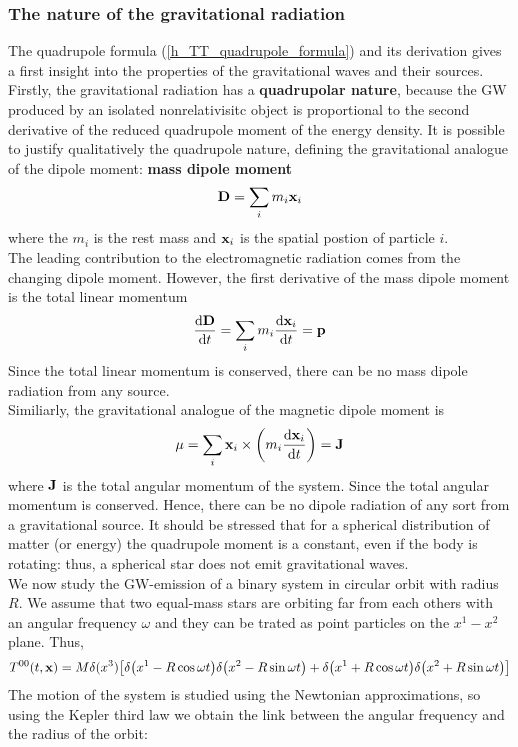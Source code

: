 \subsubsection{The nature of the gravitational radiation}
The quadrupole formula (\ref{h_TT_quadrupole_formula}) and its derivation gives a  first insight into the properties of the gravitational waves and their sources.\\
Firstly, the gravitational radiation has a \textbf{quadrupolar nature}, because the GW produced by an isolated nonrelativisitc object is proportional to the second derivative of the reduced quadrupole moment of the energy density. 
It is possible to justify qualitatively
the quadrupole nature, defining the gravitational analogue of the dipole moment: \textbf{mass dipole moment}
\begin{equation}
\label{mass_dipole_moment}
\vb{D} = \sum _{i} m_{i} \vb{x}_i
\end{equation}
where the $m_i$ is the rest mass and $\vb{x}_{i}$ is the spatial postion of particle $i$.\\
The leading contribution to the electromagnetic radiation comes from the changing dipole moment. 
However, the first derivative of the mass dipole moment is the total linear momentum
\[
\dv{\vb{D}}{t} = \sum _{i} m_i \dv{\vb{x}_i}{t} = \vb{p}
\]
Since the total linear momentum is conserved, there can be no mass dipole radiation from any source.\\
Similiarly, the gravitational analogue of the magnetic dipole moment is 
\[
\vb{\mu} = \sum_{i} \vb{x}_i \times \qty(m_i \dv{\vb{x}_i}{t}) =\vb{J}
\]
where $\vb{J}$ is the total angular momentum of the system. 
Since the total angular momentum is conserved. Hence, there can be no dipole radiation of any sort from a gravitational source.
It should be stressed that for a spherical  distribution of matter (or energy) the quadrupole moment is a constant, even if the body is rotating: thus, a spherical star does not emit gravitational waves.\\
We now study the GW-emission of a binary system in circular orbit with radius $R$.
We assume that two equal-mass stars are orbiting far from each others with an angular frequency $\omega$ and they can be trated as point particles on the $x^{1}-x^{2}$ plane. Thus,
\[
T^{00} (t,\vb{x}) = M \delta(x^{3}) \qty[
\delta\qty(x^{1}-R\cos \omega t)
\delta\qty(x^{2}-R\sin \omega t)
+
\delta\qty(x^{1}+R\cos \omega t)
\delta\qty(x^{2}+R\sin \omega t)
]
\]
The motion of the system is studied using the Newtonian approximations, so using the  Kepler third law we obtain the link between the angular frequency and the radius of the orbit:
